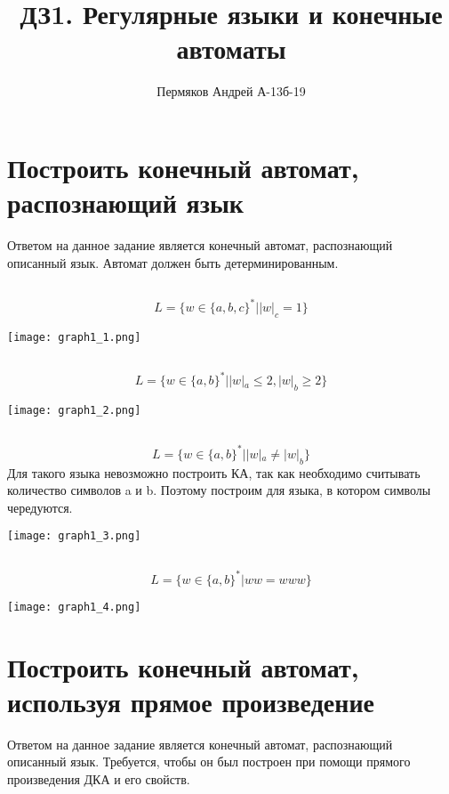 \documentclass[a4paper, 12pt]{article}
\author{Пермяков Андрей А-13б-19}
\title{ДЗ1. Регулярные языки и конечные автоматы}
\date{}
\begin{document}
\maketitle

\section{Построить конечный автомат, распознающий язык}
Ответом на данное задание является конечный автомат, распознающий описанный язык. Автомат должен быть детерминированным.

\subsection{}
$$ L = \{w \in \{a,b,c\}^* | |w|_c = 1 \} $$
\begin{center}
    \texttt{[image: graph1\_1.png]}
\end{center}

\subsection{}
$$L = \{w \in \{a,b\}^* | |w|_a \leq 2, |w|_b \geq 2 \}$$
\begin{center}
    \texttt{[image: graph1\_2.png]}
\end{center}

\subsection{}
$$L = \{w \in \{a,b\}^* | |w|_a \neq |w|_b \}$$
Для такого языка невозможно построить КА, так как необходимо считывать количество символов a и b. Поэтому построим для языка, в котором символы чередуются.
\begin{center}
    \texttt{[image: graph1\_3.png]}
\end{center}

\subsection{}
$$L = \{w \in \{a,b\}^* | ww = www \}$$
\begin{center}
    \texttt{[image: graph1\_4.png]}
\end{center}
\newpage

\section{Построить конечный автомат, используя прямое произведение}
Ответом на данное задание является конечный автомат, распознающий описанный язык. Требуется, чтобы он был построен при помощи прямого произведения ДКА и его свойств.
\end{document}
